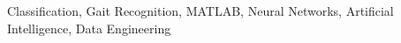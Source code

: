 \begin{IEEEkeywords}
Classification, Gait Recognition, MATLAB, Neural Networks, Artificial Intelligence, Data Engineering
\end{IEEEkeywords}
%
\begin{acronym}[Bash]
\end{acronym}
